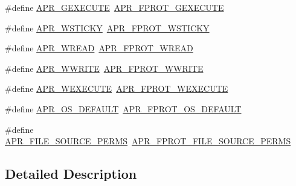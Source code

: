\begin{DoxyCompactItemize}
\item 
\#define \hyperlink{group__apr__file__permissions_ga79ce615a96a407d6c53325a2f8cdee3d}{A\-P\-R\-\_\-\-G\-E\-X\-E\-C\-U\-T\-E}~\hyperlink{group__apr__file__permissions_gab627bef3f9ceb84bbf00906eaeb12184}{A\-P\-R\-\_\-\-F\-P\-R\-O\-T\-\_\-\-G\-E\-X\-E\-C\-U\-T\-E}
\item 
\#define \hyperlink{group__apr__file__permissions_ga824d6685d59e3efddb6ee7fdbee69c13}{A\-P\-R\-\_\-\-W\-S\-T\-I\-C\-K\-Y}~\hyperlink{group__apr__file__permissions_ga989dbea02f779a5f20a643d7e4ee9952}{A\-P\-R\-\_\-\-F\-P\-R\-O\-T\-\_\-\-W\-S\-T\-I\-C\-K\-Y}
\item 
\#define \hyperlink{group__apr__file__permissions_ga5c987d2b1ace95b4ffa7c5a322721aad}{A\-P\-R\-\_\-\-W\-R\-E\-A\-D}~\hyperlink{group__apr__file__permissions_ga194718630250b0f0dd4be38c86dac717}{A\-P\-R\-\_\-\-F\-P\-R\-O\-T\-\_\-\-W\-R\-E\-A\-D}
\item 
\#define \hyperlink{group__apr__file__permissions_ga7aac61689e9aaa93176bdb4911f56863}{A\-P\-R\-\_\-\-W\-W\-R\-I\-T\-E}~\hyperlink{group__apr__file__permissions_ga51692a9828f5b6288d89495378944260}{A\-P\-R\-\_\-\-F\-P\-R\-O\-T\-\_\-\-W\-W\-R\-I\-T\-E}
\item 
\#define \hyperlink{group__apr__file__permissions_ga7bf4afea195c62f41aad1d3e94dcdac6}{A\-P\-R\-\_\-\-W\-E\-X\-E\-C\-U\-T\-E}~\hyperlink{group__apr__file__permissions_ga760d69c09b38ddf1e0aff09362d8ce11}{A\-P\-R\-\_\-\-F\-P\-R\-O\-T\-\_\-\-W\-E\-X\-E\-C\-U\-T\-E}
\item 
\#define \hyperlink{group__apr__file__permissions_ga8552adb50d545d5fc7faeabb4f4a388f}{A\-P\-R\-\_\-\-O\-S\-\_\-\-D\-E\-F\-A\-U\-L\-T}~\hyperlink{group__apr__file__permissions_gad3c65a67ee6eb12ecc6a33857397900b}{A\-P\-R\-\_\-\-F\-P\-R\-O\-T\-\_\-\-O\-S\-\_\-\-D\-E\-F\-A\-U\-L\-T}
\item 
\#define \hyperlink{group__apr__file__permissions_gaa72c8bc4ab1bd5615bee4333d23dc16b}{A\-P\-R\-\_\-\-F\-I\-L\-E\-\_\-\-S\-O\-U\-R\-C\-E\-\_\-\-P\-E\-R\-M\-S}~\hyperlink{group__apr__file__permissions_gac08d4e868c7c9532f7c97c70556663dc}{A\-P\-R\-\_\-\-F\-P\-R\-O\-T\-\_\-\-F\-I\-L\-E\-\_\-\-S\-O\-U\-R\-C\-E\-\_\-\-P\-E\-R\-M\-S}
\end{DoxyCompactItemize}


\subsection{Detailed Description}



